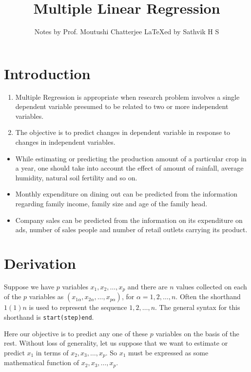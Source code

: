 \documentclass[10pt]{article}
\title{Multiple Linear Regression}
\author{Notes by Prof. Moutushi Chatterjee \LaTeX ed by Sathvik H S}
\date{}
\begin{document}
\maketitle
\tableofcontents
\clearpage
{}
\setcounter{page}{1}

\section{Introduction}
\begin{enumerate}[1.]
	\item Multiple Regression is appropriate when research problem 
		involves a single dependent variable presumed to be related to
		two or more independent variables.
	\item The objective is to predict changes in dependent variable in 
		response to changes in independent variables.
\end{enumerate}

\begin{examples}
\begin{itemize}
	\item While estimating or predicting the production amount of a particular crop in a year, one should take into account the effect of amount of rainfall, average humidity, natural soil fertility and so on.
	\item Monthly expenditure on dining out can be predicted from the information regarding family income, family size and age of the family head.
	\item Company sales can be predicted from the information on its expenditure on ads, number of sales people and number of
		retail outlets carrying its product.
\end{itemize}
\end{examples}


\section{Derivation}
Suppose we have $ p $ variables $ x_1, x_2, \ldots, x_p $ and there are $ n $ values collected on each of the $ p $ variables as 
$ \left( x_{1\alpha}, x_{2\alpha}, \ldots, x_{p\alpha} \right) $, for $ \alpha = 1, 2, \ldots, n $. 
Often the shorthand \( 1(1)n \) is used to represent the sequence \( 1, 2, \dots, n \). 
The general syntax for this shorthand is \texttt{start(step)end}. 

Here our objective is to predict any one of these $ p $ variables on the basis of the rest.
Without loss of generality, let us suppose that we want to estimate or predict $ x_1 $ in terms of $ x_2, x_3, \ldots, x_p $.
So $ x_1 $ must be expressed as some mathematical function of $ x_2, x_3, \ldots, x_p $.
\end{document}
